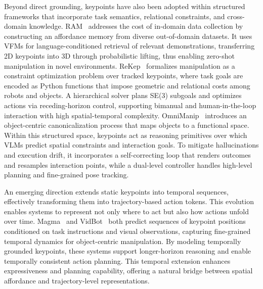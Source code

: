 \documentclass[10pt, a4paper, logo, copyright]{googledeepmind} %
\begin{document}
Beyond direct grounding, keypoints have also been adopted within structured frameworks that incorporate task semantics, relational constraints, and cross-domain knowledge. RAM~\cite{kuangram} addresses the cost of in-domain data collection by constructing an affordance memory from diverse out-of-domain datasets. It uses VFMs for language-conditioned retrieval of relevant demonstrations, transferring 2D keypoints into 3D through probabilistic lifting, thus enabling zero-shot manipulation in novel environments. ReKep~\cite{huangrekep} formalizes manipulation as a constraint optimization problem over tracked keypoints, where task goals are encoded as Python functions that impose geometric and relational costs among robots and objects. A hierarchical solver plans SE(3) subgoals and optimizes actions via receding-horizon control, supporting bimanual and human-in-the-loop interaction with high spatial-temporal complexity. OmniManip~\cite{pan2025omnimanip} introduces an object-centric canonicalization process that maps objects to a functional space. Within this structured space, keypoints act as reasoning primitives over which VLMs predict spatial constraints and interaction goals. To mitigate hallucinations and execution drift, it incorporates a self-correcting loop that renders outcomes and resamples interaction points, while a dual-level controller handles high-level planning and fine-grained pose tracking.

An emerging direction extends static keypoints into temporal sequences, effectively transforming them into trajectory-based action tokens. This evolution enables systems to represent not only where to act but also how actions unfold over time. Magma~\cite{yang2025magma} and VidBot~\cite{chen2025vidbot} both predict sequences of keypoint positions conditioned on task instructions and visual observations, capturing fine-grained temporal dynamics for object-centric manipulation. By modeling temporally grounded keypoints, these systems support longer-horizon reasoning and enable temporally consistent action planning. This temporal extension enhances expressiveness and planning capability, offering a natural bridge between spatial affordance and trajectory-level representations.
\end{document}
